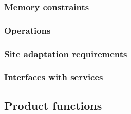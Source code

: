 \subsubsection{Memory constraints}


\subsubsection{Operations}


\subsubsection{Site adaptation requirements}

\subsubsection{Interfaces with services}

\subsection{Product functions}


